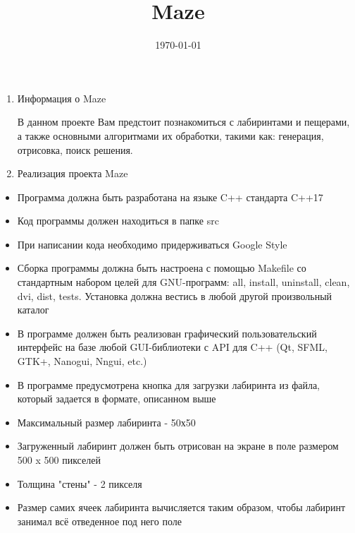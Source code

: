 \documentclass[english,russian]{article} %
\begin{document}
\title{Maze}

\date{\today}

\maketitle


\begin{enumerate}
\item Информация о Maze

В данном проекте Вам предстоит познакомиться с лабиринтами и пещерами, а также основными алгоритмами их обработки, такими как: генерация, отрисовка, поиск решения.

\item Реализация проекта Maze
\end{enumerate}
\begin{itemize}
\item Программа должна быть разработана на языке C++ стандарта C++17
\item Код программы должен находиться в папке src
\item При написании кода необходимо придерживаться Google Style
\item Сборка программы должна быть настроена с помощью Makefile со стандартным набором целей для GNU-программ: all, install, uninstall, clean, dvi, dist, tests. Установка должна вестись в любой другой произвольный каталог
\item В программе должен быть реализован графический пользовательский интерфейс на базе любой GUI-библиотеки с API для C++ (Qt, SFML, GTK+, Nanogui, Nngui, etc.)
\item В программе предусмотрена кнопка для загрузки лабиринта из файла, который задается в формате, описанном выше
\item Максимальный размер лабиринта - 50х50
\item Загруженный лабиринт должен быть отрисован на экране в поле размером 500 x 500 пикселей
\item Толщина "стены" - 2 пикселя
\item Размер самих ячеек лабиринта вычисляется таким образом, чтобы лабиринт занимал всё отведенное под него поле\end{itemize}
\end{document}
